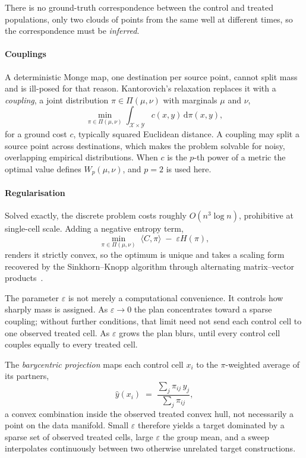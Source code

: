 \noindent
There is no ground-truth correspondence between the control and treated
populations, only two clouds of points from the same well at different times, so
the correspondence must be \emph{inferred}.

\paragraph{Couplings} A deterministic Monge map, one destination per source
point, cannot split mass and is ill-posed for that reason. Kantorovich's
relaxation replaces it with a \emph{coupling}, a joint distribution
$\pi \in \Pi(\mu,\nu)$ with marginals $\mu$ and $\nu$,
\begin{equation}
  \min_{\pi \in \Pi(\mu,\nu)} \int_{\mathcal{X}\times\mathcal{Y}}
  c(x,y)\,\mathrm{d}\pi(x,y),
\end{equation}
for a ground cost $c$, typically squared Euclidean distance. A coupling may split
a source point across destinations, which makes the problem solvable for noisy,
overlapping empirical distributions. When $c$ is the $p$-th power of a metric the
optimal value defines $W_p(\mu,\nu)$, and $p=2$ is used here.

\paragraph{Regularisation}
Solved exactly, the discrete problem costs roughly $O(n^3 \log n)$, prohibitive
at single-cell scale. Adding a negative entropy term,
\begin{equation}
  \min_{\pi \in \Pi(\mu,\nu)} \; \langle C, \pi \rangle \;-\;
  \varepsilon H(\pi),
\end{equation}
renders it strictly convex, so the optimum is unique and takes a scaling form
recovered by the Sinkhorn--Knopp algorithm through alternating matrix--vector
products~\cite{cuturi}.

The parameter $\varepsilon$ is not merely a computational convenience. It
controls how sharply mass is assigned. As $\varepsilon \rightarrow 0$ the plan
concentrates toward a sparse coupling; without further conditions, that limit
need not send each control cell to one observed treated cell. As $\varepsilon$
grows the plan blurs, until every control cell couples equally to every treated
cell.

The \emph{barycentric projection} maps each control cell $x_i$ to the
$\pi$-weighted average of its partners,
\begin{equation}
  \hat{y}(x_i) \;=\; \frac{\sum_j \pi_{ij}\, y_j}{\sum_j \pi_{ij}},
\end{equation}
a convex combination inside the observed treated convex hull, not necessarily a
point on the data manifold. Small $\varepsilon$ therefore yields a target
dominated by a sparse set of observed treated cells, large $\varepsilon$ the
group mean, and a sweep interpolates continuously between two otherwise unrelated
target constructions.

